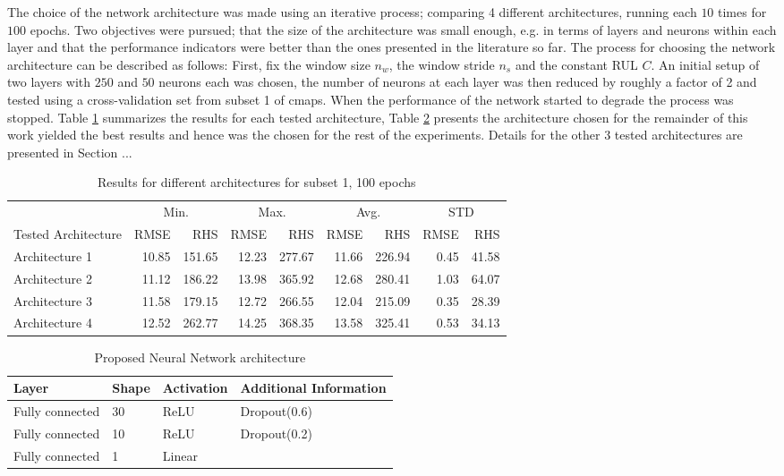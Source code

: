 The choice of the network architecture was made using an iterative process; comparing 4 different architectures, running each $10$ times for $100$ epochs. Two objectives were pursued; that the size of the architecture was small enough, e.g. in terms of layers and neurons within each layer and that the performance indicators were better than the ones presented in the literature so far. The process for choosing the network architecture can be described as follows: First, fix the window size $n_w$, the window stride $n_s$ and the constant RUL $C$. An initial setup of two layers with $250$ and $50$ neurons each was chosen, the number of neurons at each layer was then reduced by roughly a factor of 2 and tested using a cross-validation set from subset 1 of \gls{cmaps}. When the performance of the network started to degrade the process was stopped. Table  \ref{table:tested_architectures_100} summarizes the results for each tested architecture, Table \ref{table:proposed_nn} presents the architecture chosen for the remainder of this work  yielded the best results and hence was the chosen for the rest of the experiments. Details for the other 3 tested architectures are presented in Section ...

\begin{table}[!htb]
\centering
\begin{tabular}{l r r | r r | r r | r r}
	\hline	
	& \multicolumn{2}{c}{Min.} & \multicolumn{2}{c}{Max.}  & \multicolumn{2}{c}{Avg.}  & \multicolumn{2}{c}{STD} \\
	Tested Architecture & RMSE & RHS & RMSE & RHS & RMSE & RHS & RMSE & RHS\\
  	\hline
  	Architecture 1 & 10.85 & 151.65 & 12.23 & 277.67 & 11.66 & 226.94 & 0.45 & 41.58\\
  	Architecture 2 & 11.12 & 186.22 & 13.98 & 365.92 & 12.68 & 280.41 & 1.03 & 64.07\\
  	Architecture 3 & 11.58 & 179.15 & 12.72 & 266.55 & 12.04 & 215.09 & 0.35 & 28.39\\
  	Architecture 4 & 12.52 & 262.77 & 14.25 & 368.35 & 13.58 & 325.41 & 0.53 & 34.13\\
  	\hline
\end{tabular}
\caption{Results for different architectures for subset 1, 100 epochs}
\label{table:tested_architectures_100}
\end{table}

\begin{table}[!htb]
\centering
\begin{tabular}{l l l l}
	\hline
	Layer & Shape & Activation & Additional Information\\
  	\hline
  	Fully connected & 30 & ReLU & Dropout(0.6)\\
  	Fully connected & 10 & ReLU & Dropout(0.2)\\
  	Fully connected & 1 & Linear & \\
  	\hline
\end{tabular}
\caption{Proposed Neural Network architecture}
\label{table:proposed_nn}
\end{table}


